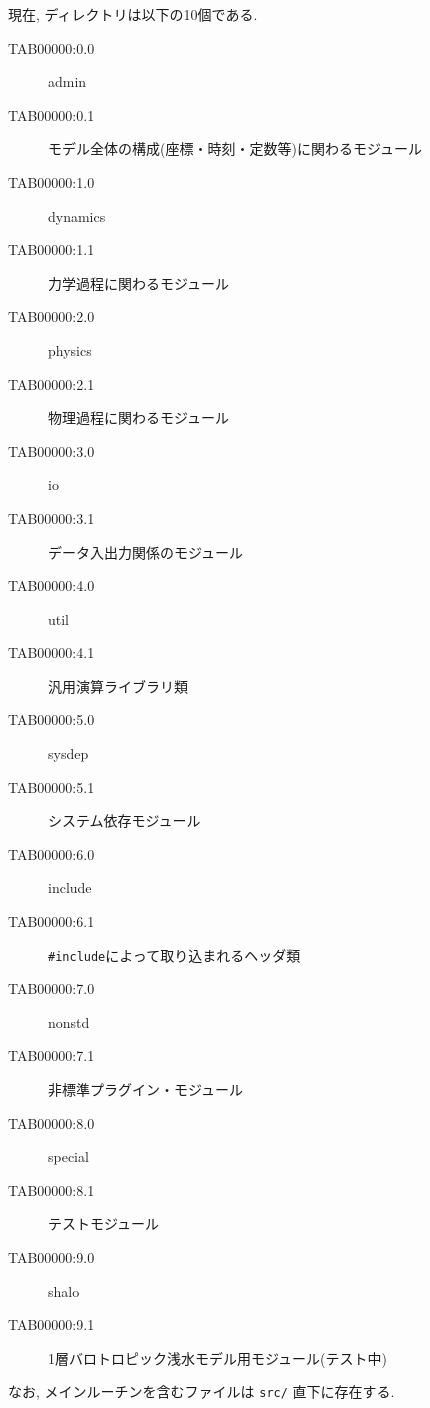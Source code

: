 \・現在, ディレクトリは以下の10個である. 
\begin{center}
\begin{description}
\item[TAB00000:0.0] admin
\item[TAB00000:0.1] モデル全体の構成(座標・時刻・定数等)に関わるモジュール
\item[TAB00000:1.0] dynamics
\item[TAB00000:1.1] 力学過程に関わるモジュール
\item[TAB00000:2.0] physics
\item[TAB00000:2.1] 物理過程に関わるモジュール
\item[TAB00000:3.0] io
\item[TAB00000:3.1] データ入出力関係のモジュール
\item[TAB00000:4.0] util
\item[TAB00000:4.1] 汎用演算ライブラリ類
\item[TAB00000:5.0] sysdep
\item[TAB00000:5.1] システム依存モジュール
\item[TAB00000:6.0] include
\item[TAB00000:6.1] {\tt \#include}によって取り込まれるヘッダ類
\item[TAB00000:7.0] nonstd
\item[TAB00000:7.1] 非標準プラグイン・モジュール
\item[TAB00000:8.0] special
\item[TAB00000:8.1] テストモジュール
\item[TAB00000:9.0] shalo
\item[TAB00000:9.1] 1層バロトロピック浅水モデル用モジュール(テスト中)
\end{description}
\end{center}
なお, メインルーチンを含むファイルは {\tt src/} 直下に存在する.


